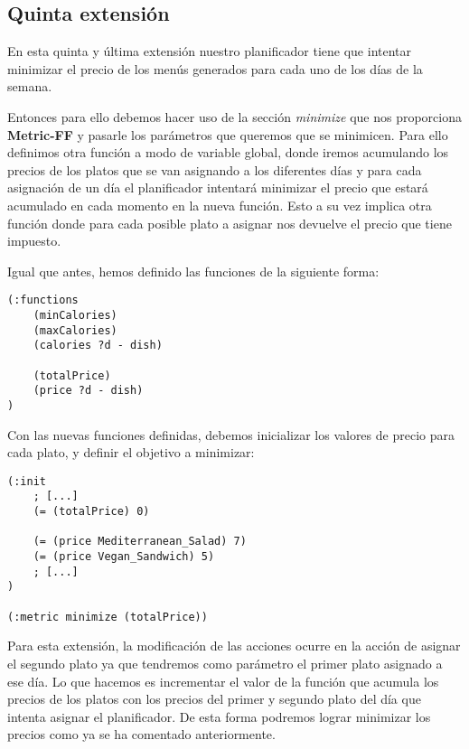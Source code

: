 \documentclass{article}
\begin{document}
\subsection{Quinta extensión}
En esta quinta y última extensión nuestro planificador tiene que intentar minimizar el precio de los menús generados para cada uno de los días de la semana.
\par
Entonces para ello debemos hacer uso de la sección \textit{minimize} que nos proporciona \textbf{Metric-FF} y pasarle los parámetros que queremos que se minimicen. Para ello definimos otra función a modo de variable global, donde iremos acumulando los precios de los platos que se van asignando a los diferentes días y para cada asignación de un día el planificador intentará minimizar el precio que estará acumulado en cada momento en la nueva función. Esto a su vez implica otra función donde para cada posible plato a asignar nos devuelve el precio que tiene impuesto.

Igual que antes,  hemos definido las funciones de la siguiente forma:
\begin{lstlisting}[language=pddl]
(:functions
    (minCalories)
    (maxCalories)
    (calories ?d - dish)

    (totalPrice)
    (price ?d - dish)
)
\end{lstlisting}
Con las nuevas funciones definidas, debemos inicializar los valores de precio para cada plato, y definir el objetivo a minimizar:
\begin{lstlisting}[language=pddl]
(:init
    ; [...]
    (= (totalPrice) 0)

    (= (price Mediterranean_Salad) 7)
    (= (price Vegan_Sandwich) 5)
    ; [...]
)

(:metric minimize (totalPrice))
\end{lstlisting}

Para esta extensión, la modificación de las acciones ocurre en la acción de asignar el segundo plato ya que tendremos como parámetro el primer plato asignado a ese día. Lo que hacemos es incrementar el valor de la función que acumula los precios de los platos con los precios del primer y segundo plato del día que intenta asignar el planificador. De esta forma podremos lograr minimizar los precios como ya se ha comentado anteriormente.
\end{document}
